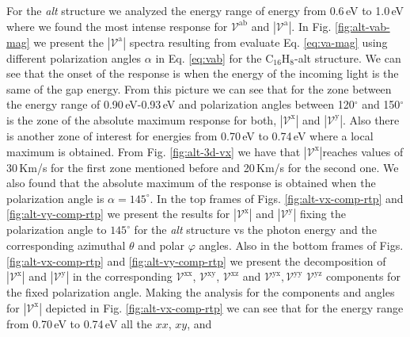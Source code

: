 \documentclass[prb,11pt,tightenlines,twocolumn,aps]{revtex4-1}
\begin{document}
For the \emph{alt} structure we analyzed the energy range of energy from
0.6\,eV to 1.0\,eV where we found the most intense response for
$\mathcal{V}^{\mathrm{ab}}$ and $|\mathcal{V}^{\mathrm{a}}|$. In Fig. 
\ref{fig:alt-vab-mag} we present the $|\mathcal{V}^{\mathrm{a}}|$ spectra
resulting from evaluate Eq. \eqref{eq:va-mag} using different polarization
angles $\alpha$ in Eq. \eqref{eq:vab} for the C$_{16}$H$_{8}$-alt structure. We
can see that the onset of the response is when the energy of the incoming light
is the same of the gap energy.
%
From this picture we can see that for the zone between the energy range of
0.90\,eV-0.93\,eV and polarization angles between 120$^{\circ}$ and
150$^{\circ}$ is the zone of the absolute maximum response for both,
$|\mathcal{V}^{\mathrm{x}}|$ and $|\mathcal{V}^{\mathrm{y}}|$. Also there is
another zone of interest for energies from 0.70\,eV to 0.74\,eV where a local
maximum is obtained.
From Fig. \ref{fig:alt-3d-vx} we have that $|\mathcal{V}^{\mathrm{x}}|$reaches
values of 30\,Km/s for the first zone mentioned before and 20\,Km/s for
the second one. 
We also found that the absolute maximum of the response is obtained when the
polarization angle is $\alpha = 145^{\circ}$. 
%
In the top frames of Figs. \ref{fig:alt-vx-comp-rtp}  and 
\ref{fig:alt-vy-comp-rtp} we present the results for
$|\mathcal{V}^{\mathrm{x}}|$ and $|\mathcal{V}^{\mathrm{y}}|$ fixing the
polarization angle to $145^{\circ}$ for the \emph{alt} structure vs the photon
energy and the corresponding azimuthal $\theta$ and polar $\varphi$ angles.
%
Also in the bottom frames of Figs. \ref{fig:alt-vx-comp-rtp} and 
%
\ref{fig:alt-vy-comp-rtp} we present the decomposition of
$|\mathcal{V}^{\mathrm{x}}|$ and $|\mathcal{V}^{\mathrm{y}}|$ in the
corresponding $\mathcal{V}^{\mathrm{xx}}$, $\mathcal{V}^{\mathrm{xy}}$,
$\mathcal{V}^{\mathrm{xz}}$ and
$\mathcal{V}^{\mathrm{yx}},\mathcal{V}^{\mathrm{yy}}$
$\mathcal{V}^{\mathrm{yz}}$ components for the fixed polarization angle.
Making the analysis for the components and angles for
$|\mathcal{V}^{\mathrm{x}}|$ depicted in Fig. \ref{fig:alt-vx-comp-rtp} we can
see that for the energy range from 0.70\,eV to 0.74\,eV all the $xx$, $xy$, and
\end{document}
